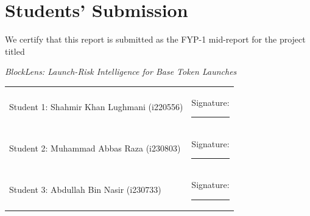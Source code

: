 \chapter*{Students' Submission}
We certify that this report is submitted as the FYP-1 mid-report for the project titled

\begin{center}\textit{BlockLens: Launch-Risk Intelligence for Base Token Launches}\end{center}
\vspace{1cm}
\begin{tabular}{p{}p{}}
Student 1: Shahmir Khan Lughmani (i220556) & Signature: \rule{0.25\textwidth}{0.4pt}\\[1cm]
Student 2: Muhammad Abbas Raza (i230803) & Signature: \rule{0.25\textwidth}{0.4pt}\\[1cm]
Student 3: Abdullah Bin Nasir (i230733) & Signature: \rule{0.25\textwidth}{0.4pt}
\end{tabular}
